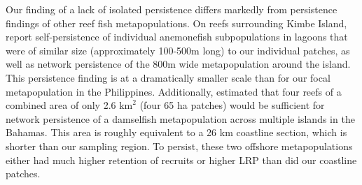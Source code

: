 \documentclass[12pt, oneside]{article}   	%
\begin{document}

Our finding of a lack of isolated persistence differs markedly from persistence findings of other reef fish metapopulations. On reefs surrounding Kimbe Island, \cite{salles_coral_2015} report self-persistence of individual anemonefish subpopulations in lagoons that were of similar size (approximately 100-500m long) to our individual patches, as well as network persistence of the 800m wide metapopulation around the island. This persistence finding is at a dramatically smaller scale than for our focal metapopulation in the Philippines. Additionally, \cite{johnson2018integrating} estimated that four reefs of a combined area of only 2.6 $\text{km}^2$ (four 65 ha patches) would be sufficient for network persistence of a damselfish metapopulation across multiple islands in the Bahamas. This area is roughly equivalent to a 26 km coastline section, which is shorter than our sampling region. To persist, these two offshore metapopulations either had much higher retention of recruits or higher LRP than did our coastline patches. 
\end{document}
